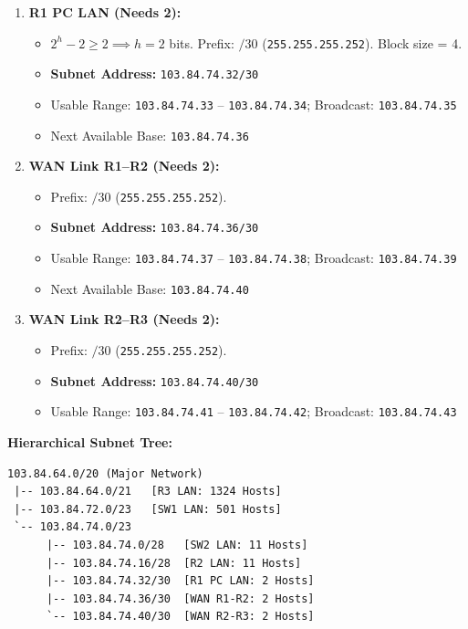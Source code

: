 \documentclass[11pt,a4paper]{article}
\begin{document}
\begin{enumerate}
    \item \textbf{R1 PC LAN (Needs 2):}
    \begin{itemize}
        \item $2^h - 2 \ge 2 \implies h = 2$ bits. Prefix: $/30$ (\texttt{255.255.255.252}). Block size = 4.
        \item \textbf{Subnet Address:} \texttt{103.84.74.32/30}
        \item Usable Range: \texttt{103.84.74.33} -- \texttt{103.84.74.34}; Broadcast: \texttt{103.84.74.35}
        \item Next Available Base: \texttt{103.84.74.36}
    \end{itemize}

    \item \textbf{WAN Link R1--R2 (Needs 2):}
    \begin{itemize}
        \item Prefix: $/30$ (\texttt{255.255.255.252}).
        \item \textbf{Subnet Address:} \texttt{103.84.74.36/30}
        \item Usable Range: \texttt{103.84.74.37} -- \texttt{103.84.74.38}; Broadcast: \texttt{103.84.74.39}
        \item Next Available Base: \texttt{103.84.74.40}
    \end{itemize}

    \item \textbf{WAN Link R2--R3 (Needs 2):}
    \begin{itemize}
        \item Prefix: $/30$ (\texttt{255.255.255.252}).
        \item \textbf{Subnet Address:} \texttt{103.84.74.40/30}
        \item Usable Range: \texttt{103.84.74.41} -- \texttt{103.84.74.42}; Broadcast: \texttt{103.84.74.43}
    \end{itemize}
\end{enumerate}

\textbf{Hierarchical Subnet Tree:}
\begin{verbatim}
103.84.64.0/20 (Major Network)
 |-- 103.84.64.0/21   [R3 LAN: 1324 Hosts]
 |-- 103.84.72.0/23   [SW1 LAN: 501 Hosts]
 `-- 103.84.74.0/23
      |-- 103.84.74.0/28   [SW2 LAN: 11 Hosts]
      |-- 103.84.74.16/28  [R2 LAN: 11 Hosts]
      |-- 103.84.74.32/30  [R1 PC LAN: 2 Hosts]
      |-- 103.84.74.36/30  [WAN R1-R2: 2 Hosts]
      `-- 103.84.74.40/30  [WAN R2-R3: 2 Hosts]
\end{verbatim}
\end{document}
